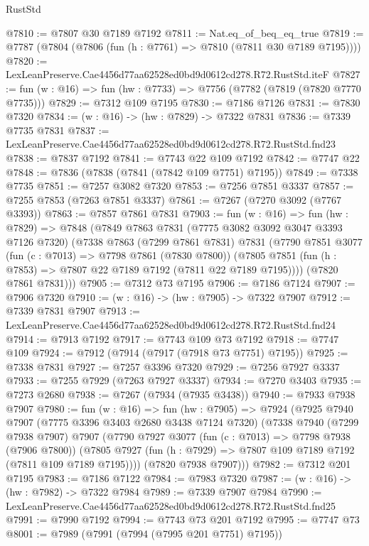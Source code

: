 \begin{lexlean}{RustStd}
\begin{coremodule}
@7810 := @7807 @30 @7189 @7192
@7811 := Nat.eq_of_beq_eq_true
@7819 := @7787 (@7804 (@7806 (fun (h : @7761) => @7810 (@7811 @30 @7189 @7195))))
@7820 := LexLeanPreserve.Cae4456d77aa62528ed0bd9d0612cd278.R72.RustStd.iteF
@7827 := fun (w : @16) => fun (hw : @7733) => @7756 (@7782 (@7819 (@7820 @7770 @7735)))
@7829 := @7312 @109 @7195
@7830 := @7186 @7126
@7831 := @7830 @7320
@7834 := (w : @16) -> (hw : @7829) -> @7322 @7831
@7836 := @7339 @7735 @7831
@7837 := LexLeanPreserve.Cae4456d77aa62528ed0bd9d0612cd278.R72.RustStd.fnd23
@7838 := @7837 @7192
@7841 := @7743 @22 @109 @7192
@7842 := @7747 @22
@7848 := @7836 (@7838 (@7841 (@7842 @109 @7751) @7195))
@7849 := @7338 @7735
@7851 := @7257 @3082 @7320
@7853 := @7256 @7851 @3337
@7857 := @7255 @7853 (@7263 @7851 @3337)
@7861 := @7267 (@7270 @3092 (@7767 @3393))
@7863 := @7857 @7861 @7831
@7903 := fun (w : @16) =>
  fun (hw : @7829) =>
  @7848
    (@7849
      @7863
      @7831
      (@7775 @3082 @3092 @3047 @3393 @7126 @7320)
      (@7338
        @7863
        (@7299 @7861 @7831)
        @7831
        (@7790
          @7851
          @3077
          (fun (c : @7013) => @7798 @7861 (@7830 @7800))
          (@7805 @7851 (fun (h : @7853) => @7807 @22 @7189 @7192 (@7811 @22 @7189 @7195))))
        (@7820 @7861 @7831)))
@7905 := @7312 @73 @7195
@7906 := @7186 @7124
@7907 := @7906 @7320
@7910 := (w : @16) -> (hw : @7905) -> @7322 @7907
@7912 := @7339 @7831 @7907
@7913 := LexLeanPreserve.Cae4456d77aa62528ed0bd9d0612cd278.R72.RustStd.fnd24
@7914 := @7913 @7192
@7917 := @7743 @109 @73 @7192
@7918 := @7747 @109
@7924 := @7912 (@7914 (@7917 (@7918 @73 @7751) @7195))
@7925 := @7338 @7831
@7927 := @7257 @3396 @7320
@7929 := @7256 @7927 @3337
@7933 := @7255 @7929 (@7263 @7927 @3337)
@7934 := @7270 @3403
@7935 := @7273 @2680
@7938 := @7267 (@7934 (@7935 @3438))
@7940 := @7933 @7938 @7907
@7980 := fun (w : @16) =>
  fun (hw : @7905) =>
  @7924
    (@7925
      @7940
      @7907
      (@7775 @3396 @3403 @2680 @3438 @7124 @7320)
      (@7338
        @7940
        (@7299 @7938 @7907)
        @7907
        (@7790
          @7927
          @3077
          (fun (c : @7013) => @7798 @7938 (@7906 @7800))
          (@7805 @7927 (fun (h : @7929) => @7807 @109 @7189 @7192 (@7811 @109 @7189 @7195))))
        (@7820 @7938 @7907)))
@7982 := @7312 @201 @7195
@7983 := @7186 @7122
@7984 := @7983 @7320
@7987 := (w : @16) -> (hw : @7982) -> @7322 @7984
@7989 := @7339 @7907 @7984
@7990 := LexLeanPreserve.Cae4456d77aa62528ed0bd9d0612cd278.R72.RustStd.fnd25
@7991 := @7990 @7192
@7994 := @7743 @73 @201 @7192
@7995 := @7747 @73
@8001 := @7989 (@7991 (@7994 (@7995 @201 @7751) @7195))

\end{coremodule}
\end{lexlean}
